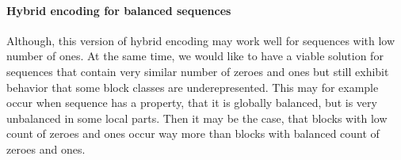 \paragraph{Hybrid encoding for balanced sequences}

Although, this version of hybrid encoding may work well for sequences with low number of ones.
At the same time, we would like to have a viable solution for sequences that contain very similar
number of zeroes and ones but still exhibit behavior that some block classes are underepresented.
This may for example occur when sequence has a property, that it is globally balanced, but is very
unbalanced in some local parts. Then it may be the case, that blocks with low count of zeroes and
ones occur way more than blocks with balanced count of zeroes and ones. 